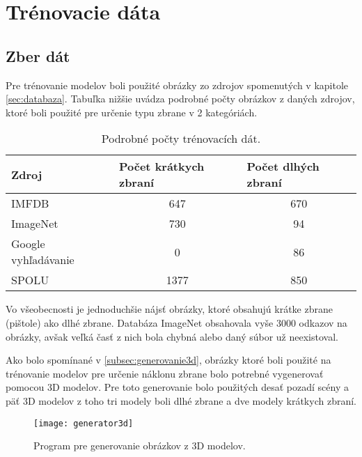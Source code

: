 
\section{Trénovacie dáta}
\label{sec:trenovaciedata}

\subsection{Zber dát}
Pre trénovanie modelov boli použité obrázky zo zdrojov spomenutých v kapitole \ref{sec:databaza}.
Tabuľka nižšie uvádza podrobné počty obrázkov z daných zdrojov, ktoré boli použité pre určenie typu zbrane v 2 kategóriách.

\begin{table}[H]
  \centering
  \label{my-label}
  \begin{tabular}{|l|c|c|}
    \hline
    Zdroj               & \multicolumn{1}{l|}{Počet krátkych zbraní} & \multicolumn{1}{l|}{Počet dlhých zbraní} \\ \hline
    IMFDB               & 647                                        & 670                                      \\ \hline
    ImageNet            & 730                                        & 94                                       \\ \hline
    Google vyhľadávanie & 0                                          & 86                                       \\ \hline \hline
    SPOLU               & 1377                                       & 850                                      \\ \hline
  \end{tabular}
  \caption{Podrobné počty trénovacích dát.}
\end{table}

Vo všeobecnosti je jednoduchšie nájsť obrázky, ktoré obsahujú krátke zbrane (pištole) ako dlhé zbrane.
Databáza ImageNet obsahovala vyše 3000 odkazov na obrázky, avšak veľká časť z nich bola chybná alebo daný súbor už neexistoval.

Ako bolo spomínané v \ref{subsec:generovanie3d}, obrázky ktoré boli použité na trénovanie modelov pre určenie náklonu zbrane bolo potrebné
    vygenerovať pomocou 3D modelov.
Pre toto generovanie bolo použitých desať pozadí scény a päť 3D modelov z toho tri modely boli dlhé zbrane a dve modely krátkych zbraní.

\begin{figure}[H]
    \centering
    \texttt{[image: generator3d]}
    \caption{Program pre generovanie obrázkov z 3D modelov.}
    \label{pic:generator3d}
\end{figure}

